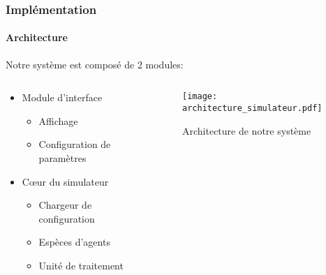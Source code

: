 \begin{frame}[shrink]
    \frametitle{Implémentation}
    \framesubtitle{Architecture}
    Notre système est composé de 2 modules:

    \begin{columns}[c]
        \begin{column}{0.45\textwidth}
            \begin{itemize}
                \item Module d'interface
                \begin{itemize}
                    \item Affichage
                    \item Configuration de paramètres
                \end{itemize}
                \item C\oe ur du simulateur
                \begin{itemize}
                    \item Chargeur de configuration
                    \item Espèces d'agents
                    \item Unité de traitement
                \end{itemize}
            \end{itemize}

        \end{column}
        \pause{}%
        \begin{column}{0.45\textwidth}
            \begin{figure}[h]
                \centering
                \texttt{[image: architecture\_simulateur.pdf]}
                \caption{Architecture de notre système}
                \label{fig:architecture-simulateur}
            \end{figure}
        \end{column}
    \end{columns}

\end{frame}

